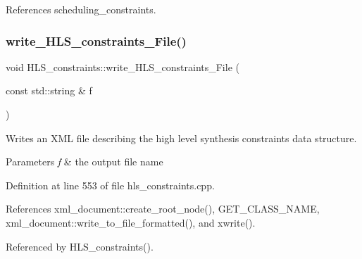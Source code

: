 References scheduling\+\_\+constraints.

\mbox{\label{classHLS__constraints_ad69227a7f2d1c6266571737752438e21}} 
\subsubsection{\texorpdfstring{write\+\_\+\+H\+L\+S\+\_\+constraints\+\_\+\+File()}{write\_HLS\_constraints\_File()}}
{\footnotesize\ttfamily void H\+L\+S\+\_\+constraints\+::write\+\_\+\+H\+L\+S\+\_\+constraints\+\_\+\+File (\begin{DoxyParamCaption}\item[{const std\+::string \&}]{f }\end{DoxyParamCaption})}



Writes an X\+ML file describing the high level synthesis constraints data structure. 


\begin{DoxyParams}{Parameters}
{\em f} & the output file name \\
\hline
\end{DoxyParams}


Definition at line 553 of file hls\+\_\+constraints.\+cpp.



References xml\+\_\+document\+::create\+\_\+root\+\_\+node(), G\+E\+T\+\_\+\+C\+L\+A\+S\+S\+\_\+\+N\+A\+ME, xml\+\_\+document\+::write\+\_\+to\+\_\+file\+\_\+formatted(), and xwrite().



Referenced by H\+L\+S\+\_\+constraints().

